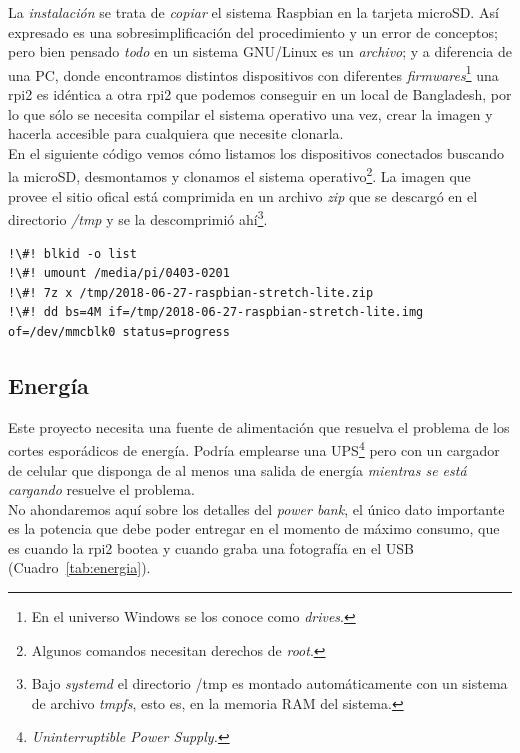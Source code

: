 \documentclass[10pt,a4paper]{article}
\begin{document}
La \emph{instalaci\'on} se trata de \emph{copiar} el sistema Raspbian en la tarjeta microSD. As\'i expresado es una sobresimplificaci\'on del procedimiento y un error de conceptos; pero bien pensado \emph{todo} en un sistema GNU/Linux es un \emph{archivo}; y a diferencia de una PC, donde encontramos distintos dispositivos con diferentes \emph{firmwares}\footnote{En el universo Windows se los conoce como \emph{drives}.} una rpi2 es id\'entica a otra rpi2 que podemos conseguir en un local de Bangladesh, por lo que s\'olo se necesita compilar el sistema operativo una vez, crear la imagen y hacerla accesible para cualquiera que necesite clonarla.\\

En el siguiente c\'odigo vemos c\'omo listamos los dispositivos conectados buscando la microSD, desmontamos y clonamos el sistema operativo\footnote{Algunos comandos necesitan derechos de \emph{root}.}. La imagen que provee el sitio ofical est\'a comprimida en un archivo \emph{zip} que se descarg\'o en el directorio \emph{/tmp} y se la descomprimi\'o ah\'i\footnote{Bajo \emph{systemd} el directorio /tmp es montado autom\'aticamente con un sistema de archivo \emph{tmpfs}, esto es, en la memoria RAM del sistema.}.

\begin{lstlisting}
!\#! blkid -o list
!\#! umount /media/pi/0403-0201
!\#! 7z x /tmp/2018-06-27-raspbian-stretch-lite.zip
!\#! dd bs=4M if=/tmp/2018-06-27-raspbian-stretch-lite.img of=/dev/mmcblk0 status=progress
\end{lstlisting}

\subsection{Energ\'ia}

Este proyecto necesita una fuente de alimentaci\'on que resuelva el problema de los cortes espor\'adicos de energ\'ia. Podr\'ia emplearse una UPS\footnote{\emph{Uninterruptible Power Supply.}} pero con un cargador de celular que disponga de al menos una salida de energ\'ia \emph{mientras se est\'a cargando} resuelve el problema.\\

No ahondaremos aqu\'i sobre los detalles del \emph{power bank}, el \'unico dato importante es la potencia que debe poder entregar en el momento de m\'aximo consumo, que es cuando la rpi2 bootea y cuando graba una fotograf\'ia en el USB (Cuadro~\ref{tab:energia}).
\end{document}
